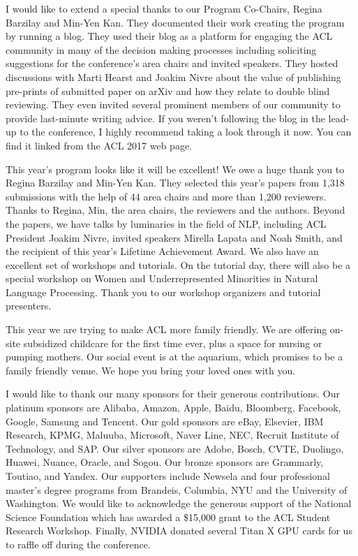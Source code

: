 I would like to extend a special thanks to our Program Co-Chairs, Regina Barzilay and Min-Yen Kan.  They documented their work creating the program by running a blog.  They used their blog as a platform for engaging the ACL community in many of the decision making processes including soliciting suggestions for the conference’s area chairs and invited speakers. They hosted discussions with Marti Hearst and Joakim Nivre about the value of publishing pre-prints of submitted paper on arXiv and how they relate to double blind reviewing.  They even invited several prominent members of our community to provide last-minute writing advice.  If you weren’t following the blog in the lead-up to the conference, I highly recommend taking a look through it now.  You can find it linked from the ACL 2017 web page.


This year's program looks like it will be excellent!  We owe a huge thank you
to Regina Barzilay and Min-Yen Kan.  They selected this
year's papers from 1,318 submissions with the help of 44 area chairs and more
than 1,200 reviewers. Thanks to Regina, Min, the area chairs, the reviewers
and the authors. Beyond the papers, we have talks by luminaries in the field
of NLP, including ACL President Joakim Nivre, invited speakers Mirella 
Lapata and Noah Smith, and the recipient of this year's Lifetime Achievement
Award.  We also have an excellent set of workshops and tutorials. 
On the tutorial day, there will also be a special workshop on Women and Underrepresented Minorities in Natural Language Processing.    Thank you to
our workshop organizers and tutorial presenters.

This year we are trying to make ACL more family friendly. We are offering
on-site subsidized childcare for the first time ever, plus a space for nursing
or pumping mothers. Our social event is at the aquarium, which promises to be
a family friendly venue. We hope you bring your loved ones with you.


I would like to thank our many sponsors for their generous contributions.  
Our platinum sponsors are 
Alibaba, 
Amazon, 
Apple, 
Baidu, 
Bloomberg, 
Facebook, 
Google, 
Samsung and 
Tencent.  
Our gold sponsors are 
eBay, 
Elsevier, 
IBM Research, 
KPMG, 
Maluuba, 
Microsoft, 
Naver Line, 
NEC,
Recruit Institute of Technology, and 
SAP.  
Our silver sponsors are 
Adobe,
Bosch,
CVTE,
Duolingo,
Huawei,
Nuance,
Oracle, and
Sogou.
Our bronze sponsors are 
Grammarly, 
Toutiao, and 
Yandex.  
Our supporters include 
Newsela 
and four professional master’s degree programs from 
Brandeis, 
Columbia, 
NYU and 
the University of Washington.  
We would like to acknowledge the generous support of the National Science Foundation which has awarded a \$15,000 grant to the ACL Student Research Workshop.
Finally, NVIDIA donated several Titan X GPU cards for us to raffle off during the conference. 

